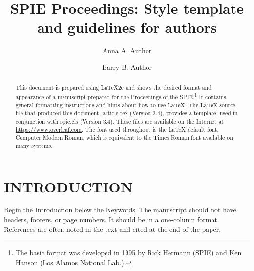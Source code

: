 \documentclass[nocompress]{spie}  %
\title{SPIE Proceedings: Style template and guidelines for authors}
\author[a]{Anna A. Author}
\author[b]{Barry B. Author}
\affil[a]{Affiliation1, Address, City, Country}
\affil[b]{Affiliation2, Address, City, Country}
\begin{document}
 
\maketitle

\begin{abstract}
This document is prepared using LaTeX2e\cite{Lamport94} and shows the desired format and appearance of a manuscript prepared for the Proceedings of the SPIE.\footnote{The basic format was developed in 1995 by Rick Hermann (SPIE) and Ken Hanson (Los Alamos National Lab.).} It contains general formatting instructions and hints about how to use LaTeX.  The LaTeX source file that produced this document, {\ttfamily article.tex} (Version 3.4), provides a template, used in conjunction with {\ttfamily spie.cls} (Version 3.4). These files are available on the Internet at \url{https://www.overleaf.com}.  The font used throughout is the LaTeX default font, Computer Modern Roman, which is equivalent to the Times Roman font available on many systems.  
\end{abstract}


\section{INTRODUCTION}
\label{sec:intro}  %

Begin the Introduction below the Keywords. The manuscript should not have headers, footers, or page numbers. It should be in a one-column format. References are often noted in the text and cited at the end of the paper.
\end{document}
